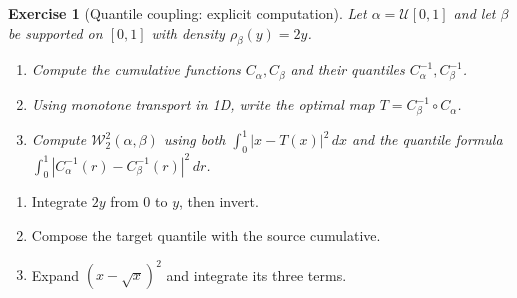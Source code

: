 \documentclass[11pt,a4paper]{article}
\theoremstyle{exostyle}
\newtheorem{exercise}{Exercise}
\newcommand{\Wtwo}{\mathcal{W}_2}
\newcommand{\Unif}{\mathcal U}
\begin{document}
\begin{exercise}[Quantile coupling: explicit computation]\label{ex:quantile}
Let $\alpha=\Unif[0,1]$ and let $\beta$ be supported on $[0,1]$ with density $\rho_\beta(y)=2y$.
\begin{enumerate}[label=(\alph*)]
\item Compute the cumulative functions $C_\alpha,C_\beta$ and their quantiles $C_\alpha^{-1},C_\beta^{-1}$.
\item Using monotone transport in 1D, write the optimal map $T=C_\beta^{-1}\circ C_\alpha$.
\item Compute $\Wtwo^2(\alpha,\beta)$ using both $\int_0^1|x-T(x)|^2\,dx$ and the quantile formula $\int_0^1|C_\alpha^{-1}(r)-C_\beta^{-1}(r)|^2\,dr$.
\end{enumerate}
\begin{center}
\end{center}
\end{exercise}
\begin{hints}
\begin{enumerate}[label=(\alph*)]\item Integrate $2y$ from $0$ to $y$, then invert.\item Compose the target quantile with the source cumulative.\item Expand $(x-\sqrt{x})^2$ and integrate its three terms.\end{enumerate}
\end{hints}
\end{document}
